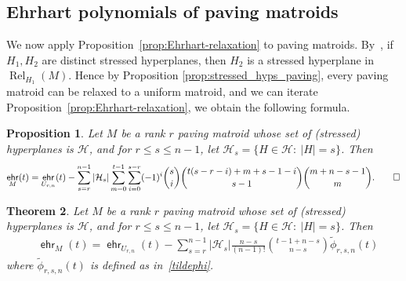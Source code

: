 \documentclass[11pt]{amsart}
\newtheorem{theorem}{Theorem}[section]
\newtheorem{proposition}[theorem]{Proposition}
\theoremstyle{definition}
\newcommand{\0}{\emptyset}
\DeclareMathOperator{\ehr}{\mathsf{ehr}}
\DeclareMathOperator{\Rel}{Rel} %
\newcommand{\HH}{\mathcal{H}}
\newcommand{\JLM}[1]{\par \noindent
  \framebox{\begin{minipage}[c]{0.95 \textwidth}\color{blue} Jeremy Note:
      #1 \end{minipage}\color{blue}}\par}
\begin{document}
\subsection{Ehrhart polynomials of paving matroids}
We now apply Proposition~\ref{prop:Ehrhart-relaxation} to paving matroids.
By~\cite[Prop.~3.9]{relaxation}, if $H_1,H_2$ are distinct stressed hyperplanes, then $H_2$ is a stressed hyperplane in $\Rel_{H_1}(M)$.
Hence by Proposition \ref{prop:stressed_hyps_paving}, every paving matroid can be relaxed to a uniform matroid, and we can iterate Proposition~\ref{prop:Ehrhart-relaxation}, we obtain the following formula.

\begin{proposition} \label{prop:ehrhart-paving}
Let $M$ be a rank $r$ paving matroid whose set of (stressed) hyperplanes is $\HH$, and for $r\leq s\leq n-1$, let $\HH_s=\{H\in\HH:\ |H|=s\}$.
Then
\[
\ehr_{M}(t)=\ehr_{U_{r,n}}(t)-\sum_{s=r}^{n-1}|\HH_s|\sum_{m=0}^{t-1}\sum_{i=0}^{s-r}(-1)^i\binom{s}{i}\binom{t(s-r-i)+m+s-1-i}{s-1}\binom{m+n-s-1}{m}.\qedhere
\]
\end{proposition}

\begin{theorem}\label{thm:Ehrhart-paving-improved-formula}
Let $M$ be a rank $r$ paving matroid whose set of (stressed) hyperplanes is $\HH$, and for $r\leq s\leq n-1$, let $\HH_s=\{H\in\HH:\ |H|=s\}$.  Then
\begin{align*}
&\ehr_{M}(t)=\ehr_{U_{r,n}}(t)-\sum_{s=r}^{n-1}|\HH_s|\frac{n-s}{(n-1)!}\binom{t-1+n-s}{n-s} \tilde\phi_{r,s,n}(t)
\end{align*}
where $\tilde\phi_{r,s,n}(t)$ is defined as in~\eqref{tildephi}.
\end{theorem}
\end{document}
